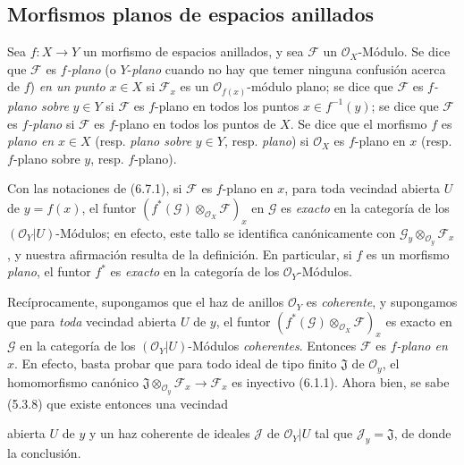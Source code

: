 \subsection{Morfismos planos de espacios anillados}
\label{subsection:0.6.7-fr}

\begin{env}[6.7.1]
\label{0.6.7.1-fr}
Sea $f:X\to Y$ un morfismo de espacios anillados, y sea $\mathcal F$ un
$\mathcal O_X$-Módulo. Se dice que $\mathcal F$ es \emph{$f$-plano} (o $Y$-\emph{plano}
cuando no hay que temer ninguna confusión acerca de $f$) \emph{en un punto} $x\in X$ si
$\mathcal F_x$ es un $\mathcal O_{f(x)}$-módulo plano; se dice que
$\mathcal F$ es \emph{$f$-plano sobre} $y\in Y$ si $\mathcal F$ es $f$-plano
en todos los puntos $x\in f^{-1}(y)$; se dice que $\mathcal F$ es \emph{$f$-plano}
si $\mathcal F$ es $f$-plano en todos los puntos de $X$. Se dice que el
morfismo $f$ es \emph{plano en} $x\in X$ (resp. \emph{plano sobre} $y\in Y$, resp.
\emph{plano}) si $\mathcal O_X$ es $f$-plano en $x$ (resp. $f$-plano sobre $y$,
resp. $f$-plano).
\end{env}

\begin{env}[6.7.2]
\label{0.6.7.2-fr}
Con las notaciones de (6.7.1), si $\mathcal F$ es $f$-plano en $x$, para toda
vecindad abierta $U$ de $y=f(x)$, el funtor
$(f^*(\mathcal G)\otimes_{\mathcal O_X}\mathcal F)_x$ en $\mathcal G$ es
\emph{exacto} en la categoría de los $(\mathcal O_Y|U)$-Módulos; en efecto, este
tallo se identifica canónicamente con
$\mathcal G_y\otimes_{\mathcal O_y}\mathcal F_x$, y nuestra afirmación resulta
de la definición. En particular, si $f$ es un morfismo \emph{plano}, el funtor
$f^*$ es \emph{exacto} en la categoría de los $\mathcal O_Y$-Módulos.
\end{env}

\begin{env}[6.7.3]
\label{0.6.7.3-fr}
Recíprocamente, supongamos que el haz de anillos $\mathcal O_Y$ es \emph{coherente}, y
supongamos que para \emph{toda} vecindad abierta $U$ de $y$, el funtor
$(f^*(\mathcal G)\otimes_{\mathcal O_X}\mathcal F)_x$ es exacto en
$\mathcal G$ en la categoría de los $(\mathcal O_Y|U)$-Módulos \emph{coherentes}.
Entonces $\mathcal F$ es \emph{$f$-plano en $x$}. En efecto, basta probar que
para todo ideal de tipo finito $\mathfrak J$ de $\mathcal O_y$,
el homomorfismo canónico
$\mathfrak J\otimes_{\mathcal O_y}\mathcal F_x\to\mathcal F_x$ es inyectivo
(6.1.1). Ahora bien, se sabe (5.3.8) que existe entonces una vecindad


abierta $U$ de $y$ y un haz coherente de ideales $\mathcal J$ de
$\mathcal O_Y|U$ tal que $\mathcal J_y=\mathfrak J$, de donde la conclusión.
\end{env}

